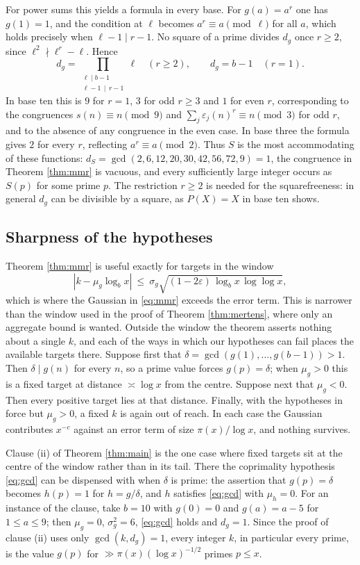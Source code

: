 \documentclass[11pt,reqno]{amsart}
\theoremstyle{plain}
\theoremstyle{definition}
\begin{document}
For power sums this yields a formula in every base. For $g(a)=a^r$ one has $g(1)=1$, and the condition at $\ell$ becomes $a^r\equiv a \pmod \ell$ for all $a$, which holds precisely when $\ell-1\mid r-1$. No square of a prime divides $d_g$ once $r\ge2$, since $\ell^2\nmid\ell^r-\ell$. Hence
\[
d_g=\prod_{\substack{\ell\mid b-1\\ \ell-1\,\mid\, r-1}}\ell\quad(r\ge2),\qquad d_g=b-1\quad(r=1).
\]
In base ten this is $9$ for $r=1$, $3$ for odd $r\ge3$ and $1$ for even $r$, corresponding to the congruences $s(n)\equiv n\pmod 9$ and $\sum_j\varepsilon_j(n)^r\equiv n \pmod 3$ for odd $r$, and to the absence of any congruence in the even case. In base three the formula gives $2$ for every $r$, reflecting $a^r\equiv a\pmod2$. Thus $S$ is the most accommodating of these functions: $d_S=\gcd(2,6,12,20,30,42,56,72,9)=1$, the congruence in Theorem \ref{thm:mmr} is vacuous, and every sufficiently large integer occurs as $S(p)$ for some prime $p$. The restriction $r\ge2$ is needed for the squarefreeness: in general $d_g$ can be divisible by a square, as $P(X)=X$ in base ten shows.

\subsection{Sharpness of the hypotheses}\label{sec:sharp}
Theorem \ref{thm:mmr} is useful exactly for targets in the window
\[
|k-\mu_g\log_b x|\ \le\ \sigma_g\sqrt{(1-2\varepsilon)\,\log_b x\,\log\log x},
\]
which is where the Gaussian in \eqref{eq:mmr} exceeds the error term. This is narrower than the window used in the proof of Theorem \ref{thm:mertens}, where only an aggregate bound is wanted. Outside the window the theorem asserts nothing about a single $k$, and each of the ways in which our hypotheses can fail places the available targets there. Suppose first that $\delta=\gcd(g(1),\dots,g(b-1))>1$. Then $\delta\mid g(n)$ for every $n$, so a prime value forces $g(p)=\delta$; when $\mu_g>0$ this is a fixed target at distance $\asymp\log x$ from the centre. Suppose next that $\mu_g<0$. Then every positive target lies at that distance. Finally, with the hypotheses in force but $\mu_g>0$, a fixed $k$ is again out of reach. In each case the Gaussian contributes $x^{-c}$ against an error term of size $\pi(x)/\log x$, and nothing survives.

Clause (ii) of Theorem \ref{thm:main} is the one case where fixed targets sit at the centre of the window rather than in its tail. There the coprimality hypothesis \eqref{eq:gcd} can be dispensed with when $\delta$ is prime: the assertion that $g(p)=\delta$ becomes $h(p)=1$ for $h=g/\delta$, and $h$ satisfies \eqref{eq:gcd} with $\mu_h=0$. For an instance of the clause, take $b=10$ with $g(0)=0$ and $g(a)=a-5$ for $1\le a\le9$; then $\mu_g=0$, $\sigma^2_g=6$, \eqref{eq:gcd} holds and $d_g=1$. Since the proof of clause (ii) uses only $\gcd(k,d_g)=1$, every integer $k$, in particular every prime, is the value $g(p)$ for $\gg\pi(x)(\log x)^{-1/2}$ primes $p\le x$.
\end{document}
